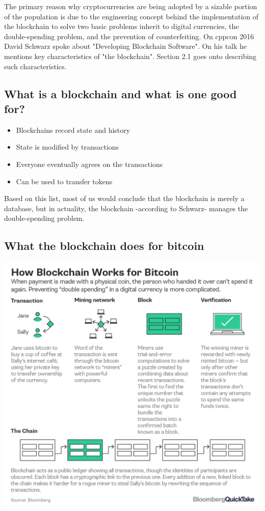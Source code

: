 \documentclass[submission,copyright,creativecommons]{eptcs}
\begin{document}
The primary reason why cryptocurrencies are being adopted by a sizable portion of the population is due to the engineering concept behind the implementation of the blockchain to solve two basic problems inherit to digital currencies, the double-spending problem, and the prevention of counterfeiting\cite{noauthor_bitcoin}.
On cppcon 2016 David Schwarz\cite{cppconCppCon2016David} spoke about "Developing Blockchain Software".  On his talk he mentions key characteristics of "the blockchain". Section 2.1 goes onto describing such characteristics.   

\subsection{What is a blockchain and what is one good for?}
\begin{itemize}
\item Blockchains record state and history
\item State is modified by transactions
\item Everyone eventually agrees on the transactions
\item Can be used to transfer tokens
\end{itemize}

Based on this list, most of us would conclude that the blockchain is merely a database, but in actuality, the blockchain -according to Schwarz\cite{cppconCppCon2016David}- manages the double-spending problem.
\subsection{What the blockchain does for bitcoin}

\includegraphics{bitcoin-blockchain-bloomberg}
\end{document}
